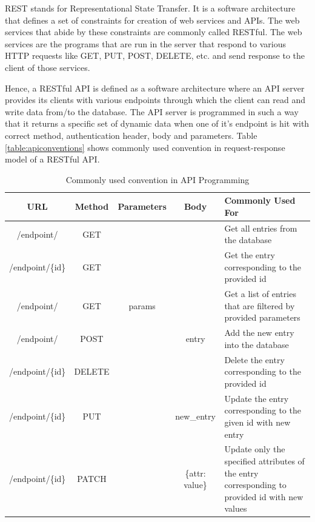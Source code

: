 \documentclass[12pt, a4paper, oneside]{article}
\begin{document}
REST stands for Representational State Transfer. It is a software architecture that defines a set of constraints for creation of web services and APIs. The web services that abide by these constraints are commonly called RESTful. The web services are the programs that are run in the server that respond to various HTTP requests like GET, PUT, POST, DELETE, etc. and send response to the client of those services.

Hence, a RESTful API is defined as a software architecture where an API server provides its clients with various endpoints through which the client can read and write data from/to the database. The API server is programmed in such a way that it returns a specific set of dynamic data when one of it's endpoint is hit with correct method, authentication header, body and parameters. Table \ref{table:apiconventions} shows commonly used convention in request-response model of a RESTful API.

\begin{table}[H]
\begin{tabularx}{\linewidth}{|c|c|c|c|X|}
\hline
\rowcolor[HTML]{C0C0C0} 
URL              & Method & Parameters &  Body & Commonly Used For                                                                              \\ \hline
/endpoint/       & GET    &                                   &                             & Get all entries from the database                                                              \\ \hline
/endpoint/\{id\} & GET    &                                   &                             & Get the entry corresponding to the provided id                                                 \\ \hline
/endpoint/       & GET    & params                            &                             & Get a list of entries that are filtered by provided parameters                                 \\ \hline
/endpoint/       & POST   &                                   & entry                       & Add the new entry into the database                                                            \\ \hline
/endpoint/\{id\} & DELETE &                                   &                             & Delete the entry corresponding to the provided id                                              \\ \hline
/endpoint/\{id\} & PUT    &                                   & new\_entry                  & Update the entry corresponding to the given id with new entry                                  \\ \hline
/endpoint/\{id\} & PATCH  &                                   & \{attr: value\}             & Update only the specified attributes of the entry corresponding to provided id with new values \\ \hline
\end{tabularx}
\caption{Commonly used convention in API Programming}
\label{table:apiconvention}
\end{table}
\end{document}
